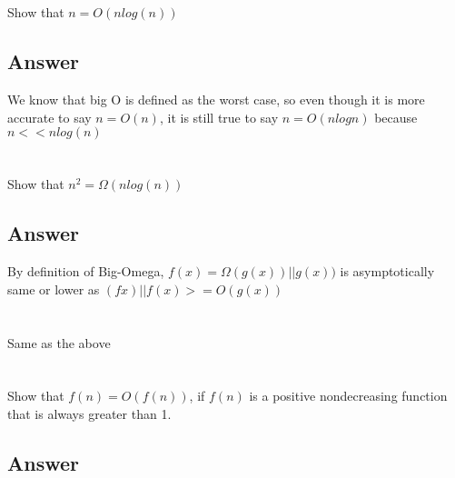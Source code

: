 \documentclass{article}
\begin{document}
\section{}

Show that \(n = O(nlog(n)) \)

\subsection{Answer}

\begin{mdframed}
  
We know that big O is defined as the worst case, so even though it is more
  accurate to say \(n = O(n)\), it is still true to say \(n = O(nlogn)\) because \(n <<
  nlog(n)\)

\end{mdframed}


\section{}

Show that \(n^2 = \Omega(nlog(n)) \)

\subsection{Answer}

\begin{mdframed}
 
  By definition of Big-Omega, \(f(x) = \Omega(g(x)) || g(x))\) is asymptotically same or
  lower as \((fx) || f(x) >= O(g(x))\)

\end{mdframed}


\section{}

Same as the above



\section{}

Show that \(f(n) = O(f(n))\), if \(f(n)\) is a positive nondecreasing function
that is always greater than 1.

\subsection{Answer}
\end{document}
